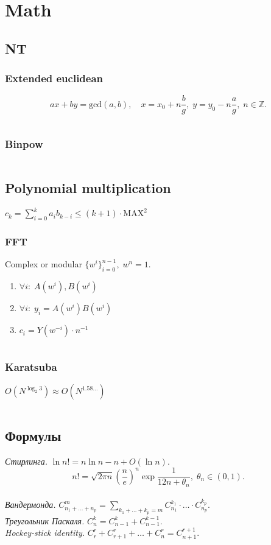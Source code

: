 \section{Math}

\subsection{NT}
\subsubsection{Extended euclidean}
$$ax+by=\text{gcd}(a,b),\quad x=x_0+n\dfrac{b}{g},\;y=y_0-n\dfrac{a}{g},\;n\in\mathbb{Z}.$$
\inputminted{cpp}{../code/math/egcd.cpp}
\subsubsection{Binpow}
\inputminted{cpp}{../code/math/binpow.cpp}

\subsection{Polynomial multiplication}
$c_k=\displaystyle\sum_{i=0}^ka_ib_{k-i}\le(k+1)\cdot\text{MAX}^2$

\subsubsection{FFT}
Complex or modular $\{w^i\}_{i=0}^{n-1},\;w^n=1$.
\begin{enumerate}
\item $\forall i:\;A(w^i),B(w^i)$
\item $\forall i:\;y_i=A(w^i)B(w^i)$
\item $c_i=Y(w^{-i})\cdot n^{-1}$
\end{enumerate}
\inputminted{cpp}{../code/math/fft.cpp}
\subsubsection{Karatsuba}
$O(N^{\log_2 3})\approx O(N^{1.58\dots})$
\inputminted{cpp}{../code/math/karatsuba.cpp}

\subsection{Формулы}
\textit{Стирлинга.} $\ln n!=n\ln n-n+O(\ln n).$
$$n!=\sqrt{2\pi n}\left(\dfrac{n}{e}\right)^n\exp\dfrac{1}{12n+\theta_n},\;\theta_n\in(0,1).$$\\
\textit{Вандермонда.} $C_{n_1+\dots+n_p}^m=\displaystyle\sum_{k_1+\dots+k_p=m}C_{n_1}^{k_1}\cdot\ldots\cdot C_{n_p}^{k_p}$.\\
\textit{Треугольник Паскаля.} $C_n^k=C_{n-1}^k+C_{n-1}^{k-1}$.\\
\textit{Hockey-stick identity.} $C_r^r+C_{r+1}^r+\dots+C_n^r=C_{n+1}^{r+1}$.\\

